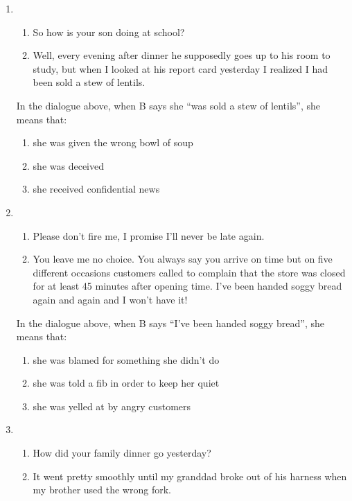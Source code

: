 \documentclass[output=paper]{langsci/langscibook}
\begin{document}
\begin{enumerate}
    \item
        \begin{enumerate}[nosep,label=\Alph*:]
        \item So how is your son doing at school?
        \item Well, every evening after dinner he supposedly goes up to his room to study, but when I looked at his report card yesterday I realized I had been sold a stew of lentils.
        \end{enumerate}
        In the dialogue above, when B says she \enquote{was sold a stew of lentils}, she means that:
        \begin{enumerate}[label=\arabic*.,noitemsep]
        \item she was given the wrong bowl of soup
        \item she was deceived
        \item she received confidential news
        \end{enumerate}
    \item
       \begin{enumerate}[nosep,label=\Alph*:]
        \item Please don't fire me, I promise I’ll never be late again.
        \item You leave me no choice. You always say you arrive on time but on five different occasions customers called to complain that the store was closed for at least 45 minutes after opening time. I've been handed soggy bread again and again and I won't have it!
        \end{enumerate}
        In the dialogue above, when B says \enquote{I've been handed soggy bread}, she means that:
        \begin{enumerate}[label=\arabic*.,noitemsep]
        \item she was blamed for something she didn't do
        \item she was told a fib in order to keep her quiet
        \item she was yelled at by angry customers
        \end{enumerate}
    \item
        \begin{enumerate}[nosep,label=\Alph*:]
        \item How did your family dinner go yesterday?
        \item It went pretty smoothly until my granddad broke out of his harness when my brother used the wrong fork.
        \end{enumerate}

\end{enumerate}
\end{document}
